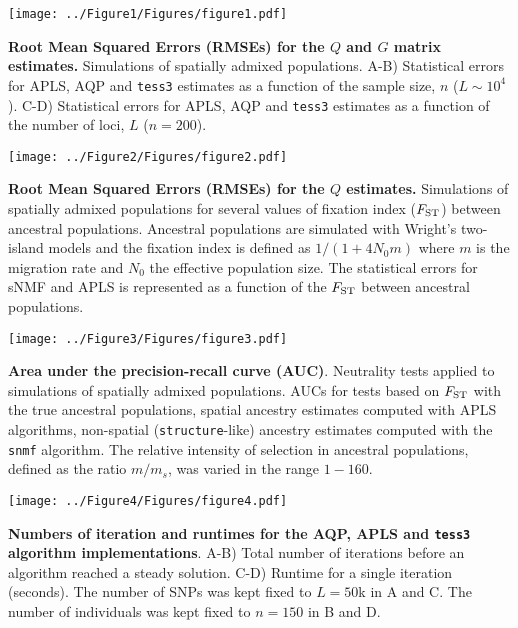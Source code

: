 
\clearpage 
\newpage


\begin{center}
\texttt{[image: ../Figure1/Figures/figure1.pdf]}
\end{center}  
 {\bf Root Mean Squared Errors (RMSEs) for the $Q$ and $G$ matrix estimates.} Simulations of spatially admixed populations. A-B) Statistical errors for APLS, AQP and {\tt tess3} estimates as a function of the sample size, $n$ ($L \sim 10^4$). C-D) Statistical errors for APLS, AQP and {\tt tess3} estimates as a function of the number of loci, $L$ ($n = 200$).

\clearpage 
\newpage


\begin{center}
\texttt{[image: ../Figure2/Figures/figure2.pdf]}
\end{center}  
 {\bf Root Mean Squared Errors (RMSEs) for the $Q$ estimates.} Simulations of spatially admixed populations for several values of fixation index ($F_{\rm ST}$) between ancestral populations. Ancestral populations are simulated with Wright’s two-island models and the fixation index is defined as $1 / (1 + 4 N_0 m)$ where $m$ is the migration rate and $N_0$ the effective population size. The statistical errors for sNMF and APLS is represented as a function of the $F_{\rm ST}$ between ancestral populations. 

\clearpage 
\newpage

\begin{center}
\texttt{[image: ../Figure3/Figures/figure3.pdf]}
\end{center}
 {\bf Area under the precision-recall curve (AUC)}. Neutrality tests applied to simulations of spatially admixed populations. AUCs for tests based on $F_{\rm ST}$ with the true ancestral populations,  spatial ancestry estimates computed with APLS algorithms, non-spatial ({\tt structure}-like) ancestry estimates computed with the {\tt snmf} algorithm. The relative intensity of selection in ancestral populations, defined as the ratio $m/m_s$, was varied in the range $1-160$.


\clearpage 
\newpage

\begin{center}
\texttt{[image: ../Figure4/Figures/figure4.pdf]}
\end{center}
 {\bf Numbers of iteration and runtimes for the AQP, APLS and {\tt tess3} algorithm implementations}. A-B)   Total number of iterations before an algorithm reached a steady solution. C-D) Runtime for a single iteration (seconds). The number of SNPs was kept fixed to $L = 50$k in A and C. The number of individuals was kept fixed to $n = 150$ in B and D.


